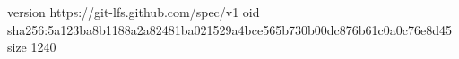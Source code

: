 version https://git-lfs.github.com/spec/v1
oid sha256:5a123ba8b1188a2a82481ba021529a4bce565b730b00dc876b61c0a0c76e8d45
size 1240
